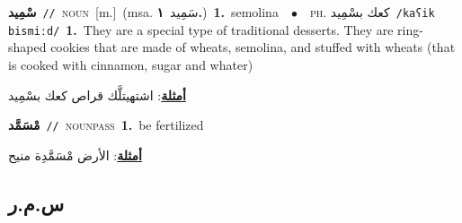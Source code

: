 \documentclass[10pt,a4paper,twoside]{article} %
\begin{document}
\begin{multicols}{2}
{\setlength\topsep{0pt}\textbf{\foreignlanguage{arabic}{سْمِيد}}\ {\color{gray}\texttt{//}\color{black}}\ \textsc{noun}\ [m.]\ \color{gray}(msa. \foreignlanguage{arabic}{سَمِيد}~\foreignlanguage{arabic}{\textbf{١.}})\color{black}\ \textbf{1.}~semolina\ \ $\bullet$\ \ \textsc{ph.} \color{gray} \foreignlanguage{arabic}{كعك بسْمِيد}\color{black}\ {\color{gray}\texttt{/{\sffamily kaʕik bismiːd}/}\color{black}}\ \textbf{1.}~They are a special type of traditional desserts. They are ring-shaped cookies that are made of wheats, semolina, and stuffed with wheats (that is cooked with cinnamon, sugar and whater)\  \begin{flushright}\color{gray}\foreignlanguage{arabic}{\textbf{\underline{\foreignlanguage{arabic}{أمثلة}}}: اشتهيتلَّك قراص كعك بسْمِيد}\end{flushright}\color{black}} \vspace{2mm}

{\setlength\topsep{0pt}\textbf{\foreignlanguage{arabic}{مْسَمَّد}}\ {\color{gray}\texttt{//}\color{black}}\ \textsc{noun\textunderscore pass}\ \textbf{1.}~be fertilized\  \begin{flushright}\color{gray}\foreignlanguage{arabic}{\textbf{\underline{\foreignlanguage{arabic}{أمثلة}}}: الأرض مْسَمَّدِة منيح}\end{flushright}\color{black}} \vspace{2mm}

\vspace{-3mm}
\subsection*{\color{blue}\foreignlanguage{arabic}{س.م.ر}\color{blue}{}} 


\end{multicols}
\end{document}
